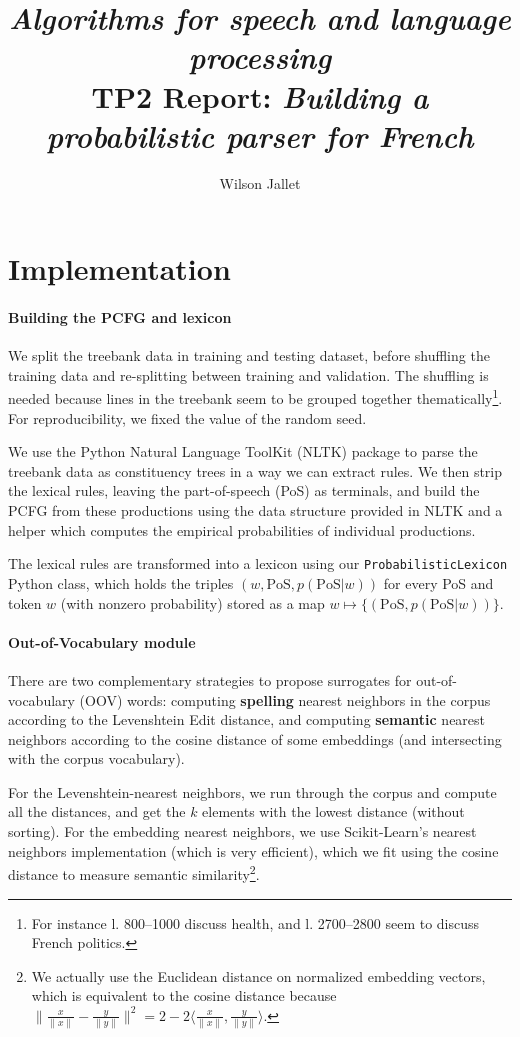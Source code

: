 \documentclass[11pt]{article}
\title{\textit{Algorithms for speech and language processing}\\
{\sffamily TP2 Report: \textit{Building a probabilistic parser for French}}}
\author{Wilson Jallet}
\begin{document}
\maketitle

\section{Implementation}

\paragraph{Building the PCFG and lexicon}

We split the treebank data in training and testing dataset, before shuffling the training data and re-splitting between training and validation. The shuffling is needed because lines in the treebank seem to be grouped together thematically\footnote{For instance l. 800--1000 discuss health, and l. 2700--2800 seem to discuss French politics.}. For reproducibility, we fixed the value of the random seed.

We use the Python Natural Language ToolKit (NLTK) \cite{nltkCitation} package to parse the treebank data as constituency trees in a way we can extract rules.
We then strip the lexical rules, leaving the part-of-speech (PoS) as terminals, and build the PCFG from these productions using the data structure provided in NLTK and a helper which computes the empirical probabilities of individual productions.

The lexical rules are transformed into a lexicon using our \lstinline|ProbabilisticLexicon| Python class, which holds the triples $(w,\mathrm{PoS}, p(\mathrm{PoS}|w))$ for every PoS and token $w$ (with nonzero probability) stored as a map $w \mapsto \{(\mathrm{PoS},p(\mathrm{PoS}|w))\}$.



\paragraph{Out-of-Vocabulary module}

There are two complementary strategies to propose surrogates for out-of-vocabulary (OOV) words: computing \textbf{spelling} nearest neighbors in the corpus according to the Levenshtein Edit distance, and computing \textbf{semantic} nearest neighbors according to the cosine distance of some embeddings (and intersecting with the corpus vocabulary).

For the Levenshtein-nearest neighbors, we run through the corpus and compute all the distances, and get the $k$ elements with the lowest distance (without sorting).
For the embedding nearest neighbors, we use Scikit-Learn's nearest neighbors implementation \cite{scikit-learn} (which is very efficient), which we fit using the cosine distance to measure semantic similarity\footnote{We actually use the Euclidean distance on normalized embedding vectors, which is equivalent to the cosine distance because $\|\frac{x}{\|x\|} - \frac{y}{\|y\|}\|^2 = 2 - 2\langle \frac{x}{\|x\|}, \frac{y}{\|y\|}\rangle$.}.
\end{document}
